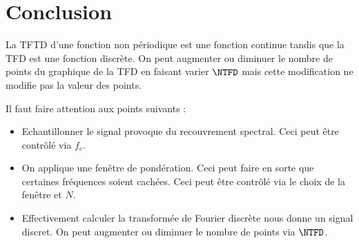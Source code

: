    \section{Conclusion}
        La TFTD d'une fonction non périodique est une fonction continue tandis que la TFD est une fonction discrète. On peut augmenter ou diminuer le nombre de points du graphique de la TFD en faisant varier $\NTFD$ mais cette modification ne modifie pas la valeur des points.

        Il faut faire attention aux points suivants :
        \begin{itemize}
            \item Echantillonner le signal provoque du recouvrement spectral. Ceci peut être contrôlé via $f_e$.
            \item On applique une fenêtre de pondération. Ceci peut faire en sorte que certaines fréquences soient cachées. Ceci peut être contrôlé via le choix de la fenêtre et $N$.
            \item Effectivement calculer la transformée de Fourier discrète nous donne un signal discret. On peut augmenter ou diminuer le nombre de points via $\NTFD$.
        \end{itemize}